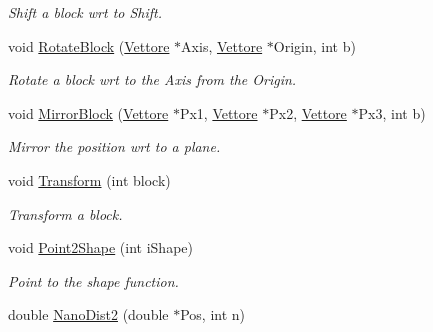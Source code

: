 \begin{DoxyCompactItemize}
\begin{DoxyCompactList}\small\item\em \-Shift a block wrt to \-Shift. \end{DoxyCompactList}\item 
\hypertarget{classVarData_a8602c7e077f0ad0c35efd44090c806d3}{void \hyperlink{classVarData_a8602c7e077f0ad0c35efd44090c806d3}{\-Rotate\-Block} (\hyperlink{classVettore}{\-Vettore} $\ast$\-Axis, \hyperlink{classVettore}{\-Vettore} $\ast$\-Origin, int b)}\label{classVarData_a8602c7e077f0ad0c35efd44090c806d3}

\begin{DoxyCompactList}\small\item\em \-Rotate a block wrt to the \-Axis from the \-Origin. \end{DoxyCompactList}\item 
\hypertarget{classVarData_a7dd5faafc8618ecad7bb716db99cdd58}{void \hyperlink{classVarData_a7dd5faafc8618ecad7bb716db99cdd58}{\-Mirror\-Block} (\hyperlink{classVettore}{\-Vettore} $\ast$\-Px1, \hyperlink{classVettore}{\-Vettore} $\ast$\-Px2, \hyperlink{classVettore}{\-Vettore} $\ast$\-Px3, int b)}\label{classVarData_a7dd5faafc8618ecad7bb716db99cdd58}

\begin{DoxyCompactList}\small\item\em \-Mirror the position wrt to a plane. \end{DoxyCompactList}\item 
\hypertarget{classVarData_aa63b2c1f38f3684a08db6394f92707f1}{void \hyperlink{classVarData_aa63b2c1f38f3684a08db6394f92707f1}{\-Transform} (int block)}\label{classVarData_aa63b2c1f38f3684a08db6394f92707f1}

\begin{DoxyCompactList}\small\item\em \-Transform a block. \end{DoxyCompactList}\item 
\hypertarget{classVarData_acd4e4b1e648b7d1ca3a169bb176e9f5c}{void \hyperlink{classVarData_acd4e4b1e648b7d1ca3a169bb176e9f5c}{\-Point2\-Shape} (int i\-Shape)}\label{classVarData_acd4e4b1e648b7d1ca3a169bb176e9f5c}

\begin{DoxyCompactList}\small\item\em \-Point to the shape function. \end{DoxyCompactList}\item 
\hypertarget{classVarData_a1dd0baef0ade6f5abcacba0d814f40d8}{double \hyperlink{classVarData_a1dd0baef0ade6f5abcacba0d814f40d8}{\-Nano\-Dist2} (double $\ast$\-Pos, int n)}\label{classVarData_a1dd0baef0ade6f5abcacba0d814f40d8}


\end{DoxyCompactItemize}
